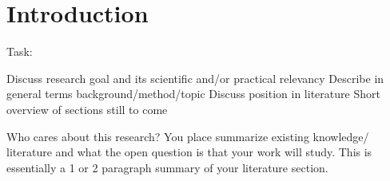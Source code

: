 \chapter{Introduction}

Task:

Discuss research goal and its scientific and/or practical relevancy
Describe in general terms background/method/topic
Discuss position in literature
Short overview of sections still to come

Who cares about this research?
You place summarize
existing knowledge/
literature and what the open
question is that your work
will study. This is essentially a 1 or 2 paragraph summary
of your literature section.